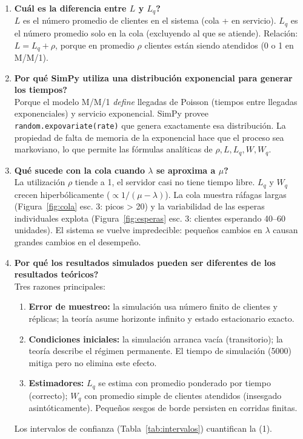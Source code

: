 \documentclass[11pt,a4paper]{article}
\begin{document}
\begin{enumerate}
    \item \textbf{\textquestiondown{}Cuál es la diferencia entre $L$ y $L_q$?}
    \\
    $L$ es el número promedio de clientes en el sistema (cola + en servicio).
    $L_q$ es el número promedio solo en la cola (excluyendo al que se atiende).
    Relación: $L = L_q + \rho$, porque en promedio $\rho$ clientes están
    siendo atendidos (0 o 1 en M/M/1).

    \item \textbf{\textquestiondown{}Por qué SimPy utiliza una distribución exponencial
    para generar los tiempos?}
    \\
    Porque el modelo M/M/1 \emph{define} llegadas de Poisson (tiempos entre
    llegadas exponenciales) y servicio exponencial. SimPy provee
    \texttt{random.expovariate(rate)} que genera exactamente esa distribución.
    La propiedad de falta de memoria de la exponencial hace que el proceso sea
    markoviano, lo que permite las fórmulas analíticas de $\rho, L, L_q, W, W_q$.

    \item \textbf{\textquestiondown{}Qué sucede con la cola cuando $\lambda$ se aproxima
    a $\mu$?}
    \\
    La utilización $\rho$ tiende a 1, el servidor casi no tiene tiempo libre.
    $L_q$ y $W_q$ crecen hiperbólicamente ($\propto 1/(\mu-\lambda)$). La cola
    muestra ráfagas largas (Figura~\ref{fig:cola} esc. 3: picos > 20) y la
    variabilidad de las esperas individuales explota (Figura~\ref{fig:esperas}
    esc. 3: clientes esperando 40--60 unidades). El sistema se vuelve
    impredecible: pequeños cambios en $\lambda$ causan grandes cambios en el
    desempeño.

    \item \textbf{\textquestiondown{}Por qué los resultados simulados pueden ser
    diferentes de los resultados teóricos?}
    \\
    Tres razones principales:
    \begin{enumerate}
        \item \textbf{Error de muestreo:} la simulación usa número finito de
              clientes y réplicas; la teoría asume horizonte infinito y estado
              estacionario exacto.
        \item \textbf{Condiciones iniciales:} la simulación arranca vacía (transitorio);
              la teoría describe el régimen permanente. El tiempo de simulación
              (5000) mitiga pero no elimina este efecto.
        \item \textbf{Estimadores:} $L_q$ se estima con promedio ponderado por tiempo
              (correcto); $W_q$ con promedio simple de clientes atendidos
              (insesgado asintóticamente). Pequeños sesgos de borde persisten en
              corridas finitas.
    \end{enumerate}
    Los intervalos de confianza (Tabla~\ref{tab:intervalos}) cuantifican la (1).


\end{enumerate}
\end{document}

